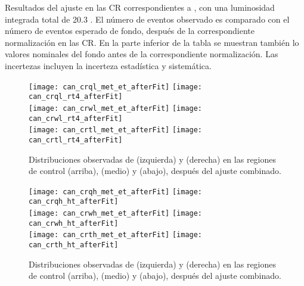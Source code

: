 \begin{table}[!htbp]

  \caption{Resultados del ajuste en las CR correspondientes a {\SRH}, con una luminosidad integrada total de 20.3 \ifb.
    El número de eventos observado es comparado con el número de eventos esperado de fondo, después de la correspondiente
    normalización en las CR. En la parte inferior de la tabla se muestran también lo valores nominales del fondo antes de
    la correspondiente normalización. Las incertezas incluyen la incerteza estadística y sistemática.}
  \label{tab:fit_result_crh}

  

\end{table}


\begin{figure}[!htbp]
  \centering

  \texttt{[image: can\_crql\_met\_et\_afterFit]}
  \texttt{[image: can\_crql\_rt4\_afterFit]} \\

  \texttt{[image: can\_crwl\_met\_et\_afterFit]}
  \texttt{[image: can\_crwl\_rt4\_afterFit]} \\

  \texttt{[image: can\_crtl\_met\_et\_afterFit]}
  \texttt{[image: can\_crtl\_rt4\_afterFit]} \\

   \caption{Distribuciones observadas de {\met} (izquierda) y {\rt} (derecha) en las
     regiones de control {\CRQL} (arriba), {\CRWL} (medio) y {\CRTL} (abajo),
     después del ajuste combinado.}
   \label{fig:bkgfit_crl_after}

\end{figure}


\begin{figure}[!htbp]
  \centering

  \texttt{[image: can\_crqh\_met\_et\_afterFit]}
  \texttt{[image: can\_crqh\_ht\_afterFit]} \\

  \texttt{[image: can\_crwh\_met\_et\_afterFit]}
  \texttt{[image: can\_crwh\_ht\_afterFit]} \\

  \texttt{[image: can\_crth\_met\_et\_afterFit]}
  \texttt{[image: can\_crth\_ht\_afterFit]} \\

  \caption{Distribuciones observadas de {\met} (izquierda) y {\HT} (derecha) en las
    regiones de control {\CRQH} (arriba), {\CRWH} (medio) y {\CRTH} (abajo),
    después del ajuste combinado.}
  \label{fig:bkgfit_crh_after}

\end{figure}





